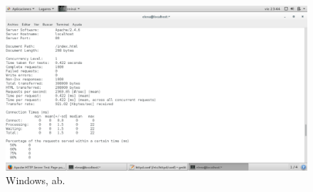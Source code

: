 \begin{figure}[H] 
	\centering
	\includegraphics[width=14.7cm]{./img/ejercicio6_2.png} 	
	\caption{Windows, ab.} \label{fig:ejercicio6_2}
\end{figure}






